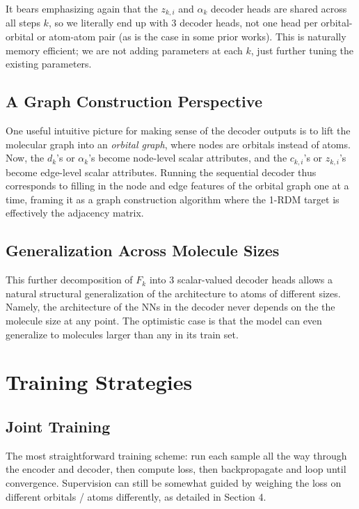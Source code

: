 \documentclass[12pt]{article}
\begin{document}
    It bears emphasizing again that the $z_{k, i}$ and $\alpha_k$ decoder heads are shared across all steps $k$, so we literally end up with 3 decoder heads, not one head per orbital-orbital or atom-atom pair (as is the case in some prior works). This is naturally memory efficient; we are not adding parameters at each $k$, just further tuning the existing parameters. 

    \subsection{A Graph Construction Perspective}
    One useful intuitive picture for making sense of the decoder outputs is to lift the molecular graph into an \textit{orbital graph}, where nodes are orbitals instead of atoms. Now, the $d_k$'s or $\alpha_k$'s become node-level scalar attributes, and the $c_{k, i}$'s or $z_{k, i}$'s become edge-level scalar attributes. Running the sequential decoder thus corresponds to filling in the node and edge features of the orbital graph one at a time, framing it as a graph construction algorithm where the 1-RDM target is effectively the adjacency matrix. 

    \subsection{Generalization Across Molecule Sizes}
    This further decomposition of $F_k$ into 3 scalar-valued decoder heads allows a natural structural generalization of the architecture to atoms of different sizes. Namely, the architecture of the NNs in the decoder never depends on the the molecule size at any point. The optimistic case is that the model can even generalize to molecules larger than any in its train set. 

    \section{Training Strategies}

    \subsection{Joint Training}
    The most straightforward training scheme: run each sample all the way through the encoder and decoder, then compute loss, then backpropagate and loop until convergence. Supervision can still be somewhat guided by weighing the loss on different orbitals / atoms differently, as detailed in Section 4. 
    
\end{document}
